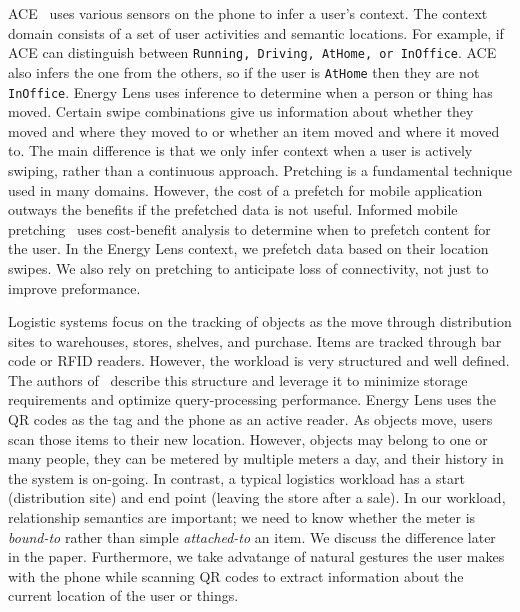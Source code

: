 ACE~\cite{ACE} uses various sensors on the phone to infer a user's context.  The context domain consists of a set of user activities
and semantic locations.  For example, if ACE can distinguish between {\tt Running, Driving, AtHome, or InOffice}.  ACE also infers 
the one from the others, so if the user is {\tt AtHome} then they are not {\tt InOffice}.  Energy Lens uses inference to determine
when a person or thing has moved.  Certain swipe combinations give us information about whether they moved and where they moved to or
whether an item moved and where it moved to.  The main difference is that we only infer context when a user is actively swiping, rather
than a continuous approach.  Pretching is a fundamental technique used in many domains.  However, the cost of a prefetch for mobile
application outways the benefits if the prefetched data is not useful.  Informed mobile pretching~\cite{IMP} uses cost-benefit analysis 
to determine when to prefetch content for the user.  In the Energy Lens context, we prefetch data based on their location swipes.
We also rely on pretching to anticipate loss of connectivity, not just to improve preformance.

Logistic systems focus on the tracking of objects as the move through distribution sites to warehouses, stores, shelves,
and purchase.  Items are tracked through bar code or RFID readers.  However, the workload is very structured and well
defined.  The authors of~\cite{rfid_gonz2006} describe this structure and leverage it to minimize storage
requirements and optimize query-processing performance.  Energy Lens uses the QR codes as the tag and the phone as an active
reader.  As objects move, users scan those items to their new location.  However, objects may belong to one or
many people, they can be metered by multiple meters a day, and their history in the system
is on-going.  In contrast, a typical logistics workload has a start (distribution site) and end point (leaving the store
after a sale).  In our workload, relationship semantics are important; we need to know whether the meter is \emph{bound-to}
rather than simple \emph{attached-to} an item.  We discuss the difference later in the paper.
Furthermore, we take advatange of natural gestures the user makes with the phone while scanning QR codes to extract
information about the current location of the user or things.

